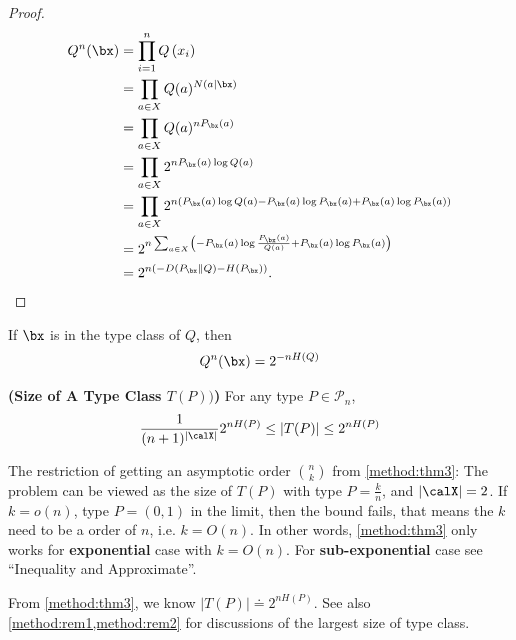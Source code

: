 \documentclass{article}
\newcommand{\typss}{\mathcal{P}_n}
\begin{document}
\begin{proof}
\begin{align*}
\begin{aligned}
Q^{n}( \bx ) &=\prod_{i=1}^{n} Q\left(x_{i}\right) \\
&=\prod_{a \in X } Q(a)^{N(a \mid \bx )} \\
&=\prod_{a \in X } Q(a)^{n P_{ \bx }(a)} \\
&=\prod_{a \in X } 2^{n P_{ \bx }(a) \log Q(a)} \\
&=\prod_{a \in X } 2^{n\left(P_{ \bx }(a) \log Q(a)-P_{ \bx }(a) \log P_{ \bx }(a)+P_{ \bx }(a) \log P_{ \bx }(a)\right)} \\
&=2^{n \sum_{a \in X }\left(-P_{ \bx }(a) \log \frac{P_{\bx}(a)}{Q(a)}+P_{ \bx }(a) \log P_{ \bx }(a)\right)} \\
&=2^{n\left(-D\left(P_{ \bx } \| Q\right)-H\left(P_{ \bx }\right)\right)} .
\end{aligned}
\end{align*}
\end{proof}
\begin{cora}
If $\bx$ is in the type class of $Q$, then
\begin{align*}
Q^{n}( \bx )=2^{-n H(Q)}
\end{align*}
\end{cora}




\begin{thma}{\bf{(Size of A Type Class $T(P))$)}}\label{method:thm3}
For any type $P \in \typss$,
\begin{align*}
\frac{1}{(n+1)^{| \calX |}} 2^{n H(P)} \leq|T(P)| \leq 2^{n H(P)}
\end{align*}
\end{thma} 

\begin{rema}{}
The restriction of getting an asymptotic order $\binom{n}{k}$ from \cref{method:thm3}: The problem can be viewed as the size of $T(P)$ with type $P=\frac{k}{n}$, and $|\calX|=2$. If $k=o(n)$, type $P=(0,1)$ in the limit, then the bound fails, that means the $k$ need to be a  order of $n$, i.e. $k=O(n)$. In other words, \cref{method:thm3} only works for \textbf{exponential} case with $k=O(n)$. For  \textbf{sub-exponential} case see ``Inequality and Approximate''.
\end{rema}

\begin{rema}{}
From \cref{method:thm3}, we know $|T(P)|\doteq 2^{nH(P)}$. See also \cref{method:rem1,method:rem2} for discussions of the largest size of type class.
\end{rema}
\end{document}
